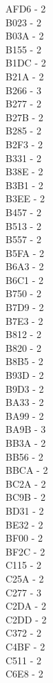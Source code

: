 \documentclass[10pt,letterpaper]{article}
\begin{document}
\begin{multicols}{5}
AFD6 -  2\\
B023 -  2\\
B03A -  2\\
B155 -  2\\
B1DC -  2\\
B21A -  2\\
B266 -  3\\
B277 -  2\\
B27B -  2\\
B285 -  2\\
B2F3 -  2\\
B331 -  2\\
B38E -  2\\
B3B1 -  2\\
B3EE -  2\\
B457 -  2\\
B513 -  2\\
B557 -  2\\
B5FA -  2\\
B6A3 -  2\\
B6C1 -  2\\
B750 -  2\\
B7D9 -  2\\
B7E3 -  2\\
B812 -  2\\
B820 -  2\\
B8B5 -  2\\
B93D -  2\\
B9D3 -  2\\
BA33 -  2\\
BA99 -  2\\
BA9B -  3\\
BB3A -  2\\
BB56 -  2\\
BBCA -  2\\
BC2A -  2\\
BC9B -  2\\
BD31 -  2\\
BE32 -  2\\
BF00 -  2\\
BF2C -  2\\
C115 -  2\\
C25A -  2\\
C277 -  3\\
C2DA -  2\\
C2DD -  2\\
C372 -  2\\
C4BF -  2\\
C511 -  2\\
C6E8 -  2\\

\end{multicols}
\end{document}
